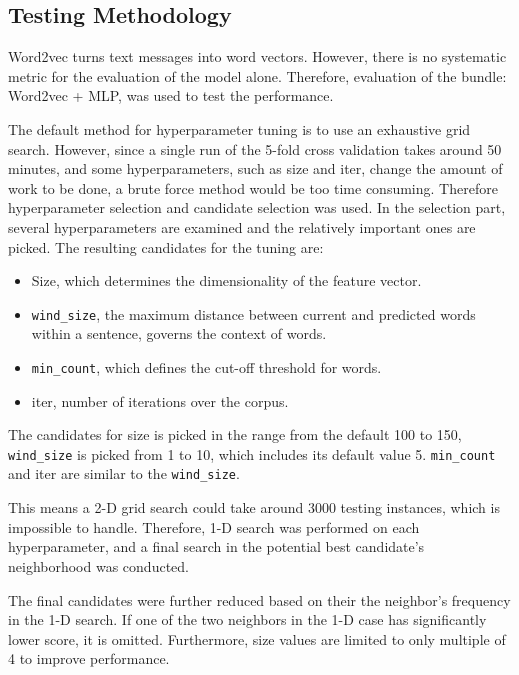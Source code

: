 \documentclass[11pt,a4paper]{article}
\begin{document}
\subsection{Testing Methodology}
Word2vec turns text messages into word vectors. However, there is no systematic metric for the evaluation of the model alone. Therefore, evaluation of the bundle: Word2vec + MLP, was used to test the performance. \par
The default method for hyperparameter tuning is to use an exhaustive grid search. However, since a single run of the 5-fold cross validation takes around 50 minutes, and some hyperparameters, such as size and iter, change the amount of work to be done, a brute force method would be too time consuming. Therefore hyperparameter selection and candidate selection was used. In the selection part, several hyperparameters are examined and the relatively important ones are picked. The resulting candidates for the tuning are:
\begin{itemize}
	\item Size, which determines the dimensionality of the feature vector.
	\item \texttt{wind\_size}, the maximum distance between current and predicted words within a sentence, governs the context of words.
	\item \texttt{min\_count}, which defines the cut-off threshold for words.
	\item iter, number of iterations over the corpus.
\end{itemize}
The candidates for size is picked in the range from the default 100 to 150, \texttt{wind\_size} is picked from 1 to 10, which includes its default value 5. \texttt{min\_count} and iter are similar to the \texttt{wind\_size}. 
\par
This means a 2-D grid search could take around 3000 testing instances, which is impossible to handle. Therefore, 1-D search was performed on each hyperparameter, and a final search in the potential best candidate's neighborhood was conducted.
\par
The final candidates were further reduced based on their the neighbor's frequency in the 1-D search. If one of the two neighbors in the 1-D case has significantly lower score, it is omitted. Furthermore, size values are limited to only multiple of 4 to improve performance.
\end{document}

